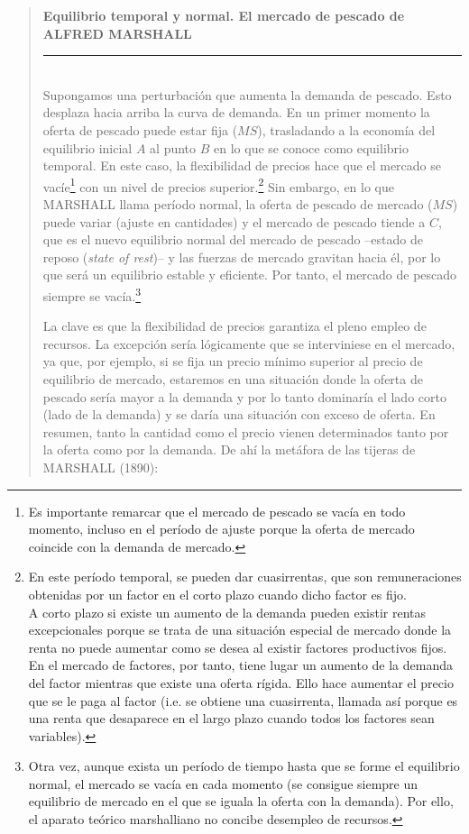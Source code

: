 \documentclass[10pt,a4paper]{article}
\newenvironment{specialblock}[1]{%
 \begin{quote} %
 \small %
 \noindent\textbf{#1}\\[-0.3em] %
 \rule{\linewidth}{0.4pt}\\[0.6em]}{
 \end{quote}}
\begin{document}
\begin{specialblock}{Equilibrio temporal y normal. El mercado de pescado de ALFRED MARSHALL}
 Supongamos una perturbación que aumenta la demanda de pescado. Esto desplaza hacia arriba la curva de demanda. En un primer momento la oferta de pescado puede estar fija ($MS$), trasladando a la economía del equilibrio inicial $A$ al punto $B$ en lo que se conoce como equilibrio temporal. En este caso, la flexibilidad de precios hace que el mercado se vacíe\footnote{%
     Es importante remarcar que el mercado de pescado se vacía en todo momento, incluso en el período de ajuste porque la oferta de mercado coincide con la demanda de mercado.
 } con un nivel de precios superior.\footnote{%
     En este período temporal, se pueden dar cuasirrentas, que son remuneraciones obtenidas por un factor en el corto plazo cuando dicho factor es fijo.\\ A corto plazo si existe un aumento de la demanda pueden existir rentas excepcionales porque se trata de una situación especial de mercado donde la renta no puede aumentar como se desea al existir factores productivos fijos. En el mercado de factores, por tanto, tiene lugar un aumento de la demanda del factor mientras que existe una oferta rígida. Ello hace aumentar el precio que se le paga al factor (i.e. se obtiene una cuasirrenta, llamada así porque es una renta que desaparece en el largo plazo cuando todos los factores sean variables).
 } Sin embargo, en lo que MARSHALL llama período normal, la oferta de pescado de mercado ($MS$) puede variar (ajuste en cantidades) y el mercado de pescado tiende a $C$, que es el nuevo equilibrio normal del mercado de pescado –estado de reposo (\textit{state of rest})– y las fuerzas de mercado gravitan hacia él, por lo que será un equilibrio estable y eficiente. Por tanto, el mercado de pescado siempre se vacía.\footnote{%
     Otra vez, aunque exista un período de tiempo hasta que se forme el equilibrio normal, el mercado se vacía en cada momento (se consigue siempre un equilibrio de mercado en el que se iguala la oferta con la demanda). Por ello, el aparato teórico marshalliano no concibe desempleo de recursos.
 } 
 
 La clave es que la flexibilidad de precios garantiza el pleno empleo de recursos. La excepción sería lógicamente que se interviniese en el mercado, ya que, por ejemplo, si se fija un precio mínimo superior al precio de equilibrio de mercado, estaremos en una situación donde la oferta de pescado sería mayor a la demanda y por lo tanto dominaría el lado corto (lado de la demanda) y se daría una situación con exceso de oferta. En resumen, tanto la cantidad como el precio vienen determinados tanto por la oferta como por la demanda. De ahí la metáfora de las tijeras de MARSHALL (1890): 


\end{specialblock}
\end{document}
